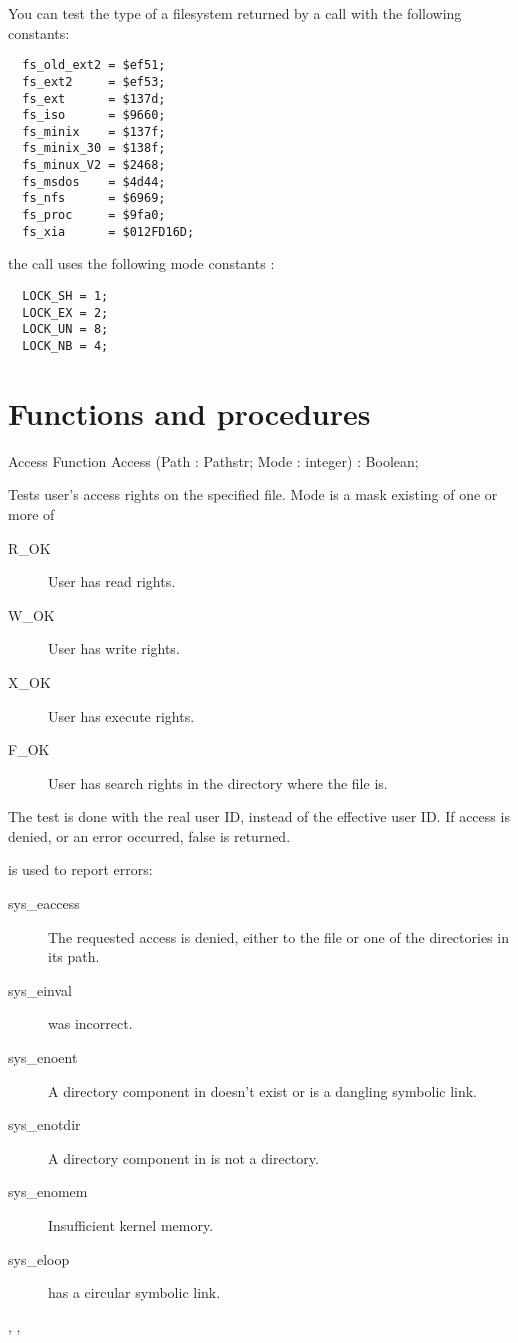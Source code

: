 You can test the type of a filesystem returned by a  call with
the following constants:
\begin{verbatim}
  fs_old_ext2 = $ef51;
  fs_ext2     = $ef53;
  fs_ext      = $137d;
  fs_iso      = $9660;
  fs_minix    = $137f;
  fs_minix_30 = $138f;
  fs_minux_V2 = $2468;
  fs_msdos    = $4d44;
  fs_nfs      = $6969;
  fs_proc     = $9fa0;
  fs_xia      = $012FD16D;
\end{verbatim}
the  call uses the following mode constants :
\begin{verbatim}
  LOCK_SH = 1;
  LOCK_EX = 2;
  LOCK_UN = 8;
  LOCK_NB = 4;
\end{verbatim}
\section{Functions and procedures}
\begin{function}{Access}
\Declaration
Function Access (Path : Pathstr; Mode : integer) : Boolean;

\Description

Tests user's access rights on the specified file. Mode is a mask existing of
one or more of
\begin{description}
\item[R\_OK] User has read rights.
\item[W\_OK] User has write rights.
\item[X\_OK] User has execute rights.
\item[F\_OK] User has search rights in the directory where the file is.
\end{description}
The test is done with the real user ID, instead of the effective user ID.
If access is denied, or an error occurred, false is returned.

\Errors
  is used to report errors:
\begin{description}
\item[sys\_eaccess] The requested access is denied, either to the file or one
of the directories in its path.
\item[sys\_einval]  was incorrect.
\item[sys\_enoent] A directory component in  doesn't exist or is a
dangling symbolic link.
\item[sys\_enotdir] A directory component in  is not a directory.
\item[sys\_enomem] Insufficient kernel memory.
\item[sys\_eloop]  has a circular symbolic link.
\end{description}

\SeeAlso
{}, ,  
\end{function}
